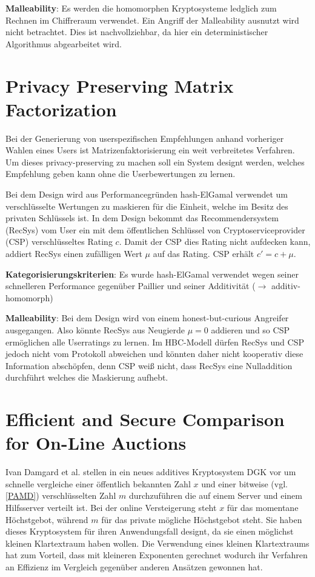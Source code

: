 \textbf{Malleability}: Es werden die homomorphen Kryptosysteme ledglich zum Rechnen im Chiffreraum verwendet. Ein Angriff der Malleability ausnutzt wird nicht betrachtet. Dies ist nachvollziehbar, da hier ein deterministischer Algorithmus abgearbeitet wird.

\section{Privacy Preserving Matrix Factorization} \cite{nikolaenko2013privacy}
Bei der Generierung von userspezifischen Empfehlungen anhand vorheriger Wahlen eines Users ist Matrizenfaktorisierung ein weit verbreitetes Verfahren. Um dieses privacy-preserving zu machen soll ein System designt werden, welches Empfehlung geben kann ohne die Userbewertungen zu lernen.

Bei dem Design wird aus Performancegründen hash-ElGamal verwendet um verschlüsselte Wertungen zu maskieren für die Einheit, welche im Besitz des privaten Schlüssels ist. In dem Design bekommt das Recommendersystem (RecSys) vom User ein mit dem öffentlichen Schlüssel von Cryptoserviceprovider (CSP) verschlüsseltes Rating $c$. Damit der CSP dies Rating nicht aufdecken kann, addiert RecSys einen zufälligen Wert $\mu$ auf das Rating. CSP erhält $c'=c+\mu$.

\textbf{Kategorisierungskriterien}: Es wurde hash-ElGamal verwendet wegen seiner schnelleren Performance gegenüber Paillier und seiner Additivität ($\rightarrow$ additiv-homomorph)

\textbf{Malleability}: Bei dem Design wird von einem honest-but-curious Angreifer ausgegangen. Also könnte RecSys aus Neugierde $\mu=0$ addieren und so CSP ermöglichen alle Userratings zu lernen. Im HBC-Modell dürfen RecSys und CSP jedoch nicht vom Protokoll abweichen und könnten daher nicht kooperativ diese Information abschöpfen, denn CSP weiß nicht, dass RecSys eine Nulladdition durchführt welches die Maskierung aufhebt.

\section{Efficient and Secure Comparison for On-Line Auctions}
\label{dgk}
Ivan Damgard et al. stellen in \cite{damgaard2007efficient} ein neues additives Kryptosystem DGK vor um schnelle vergleiche einer öffentlich bekannten Zahl $x$ und einer bitweise (vgl. \ref{PAMD}) verschlüsselten Zahl $m$ durchzuführen die auf einem Server und einem Hilfsserver verteilt ist. Bei der online Versteigerung steht $x$ für das momentane Höchstgebot, während $m$ für das private mögliche Höchstgebot steht. Sie haben dieses Kryptosystem für ihren Anwendungsfall designt, da sie einen möglichst kleinen Klartextraum haben wollen. Die Verwendung eines kleinen Klartextraums hat zum Vorteil, dass mit kleineren Exponenten gerechnet wodurch ihr Verfahren an Effizienz im Vergleich gegenüber anderen Ansätzen gewonnen hat. 

